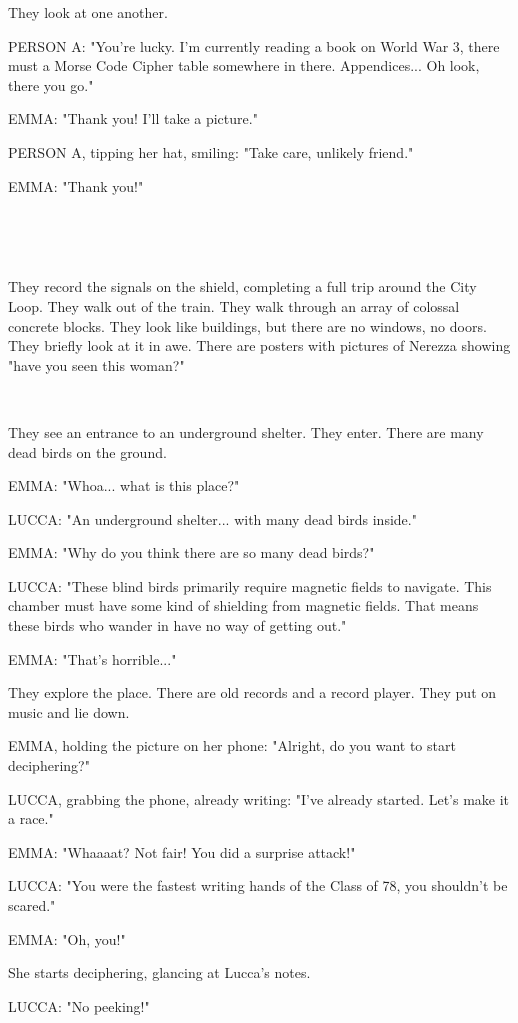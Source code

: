 \documentclass[11pt]{article}
\begin{document}
They look at one another.

PERSON A: "You're lucky. I'm currently reading a book on World War 3, there must a Morse Code Cipher table somewhere in there.
Appendices...
Oh look, there you go."

EMMA: "Thank you! I'll take a picture."

PERSON A, tipping her hat, smiling: "Take care, unlikely friend."

EMMA: "Thank you!"

\ 

\ 

They record the signals on the shield, completing a full trip around the City Loop.
They walk out of the train.
They walk through an array of colossal concrete blocks.
They look like buildings, but there are no windows, no doors.
They briefly look at it in awe.
There are posters with pictures of Nerezza showing "have you seen this woman?"

\ 

They see an entrance to an underground shelter.
They enter.
There are many dead birds on the ground.

EMMA: "Whoa... what is this place?"

LUCCA: "An underground shelter... with many dead birds inside."

EMMA: "Why do you think there are so many dead birds?"

LUCCA: "These blind birds primarily require magnetic fields to navigate. This chamber must have some kind of shielding from magnetic fields.
That means these birds who wander in have no way of getting out."

EMMA: "That's horrible..."

They explore the place.
There are old records and a record player.
They put on music and lie down.

EMMA, holding the picture on her phone: "Alright, do you want to start deciphering?"

LUCCA, grabbing the phone, already writing: "I've already started. Let's make it a race."

EMMA: "Whaaaat? Not fair! You did a surprise attack!"

LUCCA: "You were the fastest writing hands of the Class of 78, you shouldn't be scared."

EMMA: "Oh, you!"

She starts deciphering, glancing at Lucca's notes.

LUCCA: "No peeking!" 
\end{document}
